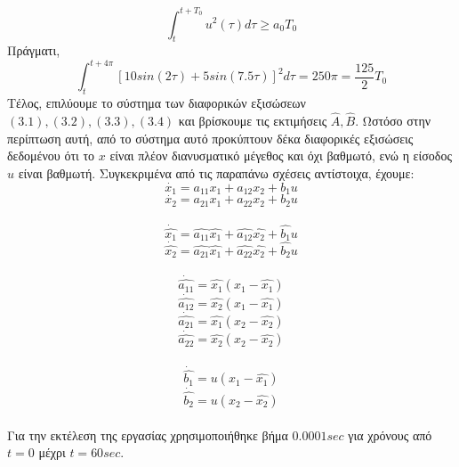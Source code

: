 \documentclass[12pt]{article}
\begin{document}
\[ \int_{t}^{t+T_0} u^2(\tau)d\tau \geq a_0T_0 \]
Πράγματι,
\[ \int_{t}^{t+4\pi} \left[10sin(2\tau)+5sin(7.5\tau)\right]^2 d\tau =250 \pi =\frac{125}{2}T_0 \]
Τέλος, επιλύουμε το σύστημα των διαφορικών εξισώσεων $(3.1),(3.2),(3.3),(3.4)$ και βρίσκουμε τις εκτιμήσεις $\hat{A},\hat{B}$. Ωστόσο στην περίπτωση αυτή, από το σύστημα αυτό προκύπτουν δέκα διαφορικές εξισώσεις δεδομένου ότι το $x$ είναι πλέον διανυσματικό μέγεθος και όχι βαθμωτό, ενώ η είσοδος $u$ είναι βαθμωτή. Συγκεκριμένα από τις παραπάνω σχέσεις αντίστοιχα, έχουμε:
\[ \dot{x_1}=a_{11}x_1+a_{12}x_2+b_1u \]
\[ \dot{x_2}=a_{21}x_1+a_{22}x_2+b_2u \]
\\
\[ \dot{\hat{x_1}}=\hat{a_{11}}\hat{x_1}+\hat{a_{12}}\hat{x_2}+\hat{b_1}u \]
\[ \dot{\hat{x_2}}=\hat{a_{21}}\hat{x_1}+\hat{a_{22}}\hat{x_2}+\hat{b_2}u \]
\\
\[ \dot{\hat{a_{11}}}=\hat{x_1}(x_1-\hat{x_1}) \]
\[ \dot{\hat{a_{12}}}=\hat{x_2}(x_1-\hat{x_1}) \]
\[ \dot{\hat{a_{21}}}=\hat{x_1}(x_2-\hat{x_2}) \]
\[ \dot{\hat{a_{22}}}=\hat{x_2}(x_2-\hat{x_2}) \]
\\
\[ \dot{\hat{b_{1}}}=u(x_1-\hat{x_1}) \]
\[ \dot{\hat{b_{2}}}=u(x_2-\hat{x_2}) \] 
\\
Για την εκτέλεση της εργασίας χρησιμοποιήθηκε βήμα $0.0001 sec$ για χρόνους από $t=0$ μέχρι $t=60 sec$. 
\end{document}
